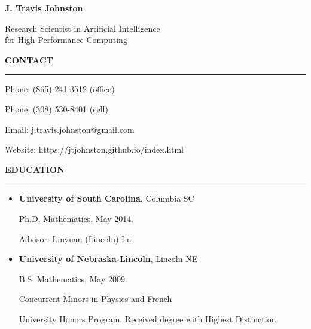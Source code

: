 \documentclass{article}
\begin{document}
\pagestyle{empty}

\begin{flushright}
\Huge
\textbf{J. Travis Johnston}

\Large
Research Scientist in Artificial Intelligence \\ for High Performance Computing
\end{flushright}




\LARGE
\noindent \textbf{CONTACT}\normalsize

\noindent \rule{\textwidth}{1px}

	Phone: (865) 241-3512	(office)

	Phone: (308) 530-8401	(cell)		
	
	Email: j.travis.johnston@gmail.com	
	
	Website: https://jtjohnston.github.io/index.html

\vspace{.25 in}



\LARGE
\noindent \textbf{EDUCATION}\normalsize

\noindent \rule{\textwidth}{1px}

	\begin{itemize}
		\item \textbf{University of South Carolina}, Columbia SC

		Ph.D. Mathematics, May 2014.

		Advisor: Linyuan (Lincoln) Lu

		\item \textbf{University of Nebraska-Lincoln}, Lincoln NE

		B.S. Mathematics, May 2009.

		Concurrent Minors in Physics and French

		University Honors Program, Received degree with Highest Distinction

%
	\end{itemize}

\vspace{.25 in}


%
%
%		
%		
%
%
%
%
%
%
%
%
%
\end{document}
